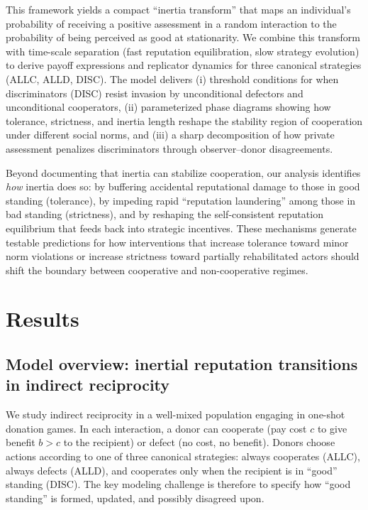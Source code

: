 \documentclass[fleqn,10pt]{wlscirep}
\begin{document}
This framework yields a compact ``inertia transform'' that maps an individual's probability of receiving a positive assessment in a random interaction to the probability of being perceived as good at stationarity. We combine this transform with time-scale separation (fast reputation equilibration, slow strategy evolution) to derive payoff expressions and replicator dynamics for three canonical strategies (ALLC, ALLD, DISC). The model delivers (i) threshold conditions for when discriminators (DISC) resist invasion by unconditional defectors and unconditional cooperators, (ii) parameterized phase diagrams showing how tolerance, strictness, and inertia length reshape the stability region of cooperation under different social norms, and (iii) a sharp decomposition of how private assessment penalizes discriminators through observer--donor disagreements.

Beyond documenting that inertia can stabilize cooperation, our analysis identifies \emph{how} inertia does so: by buffering accidental reputational damage to those in good standing (tolerance), by impeding rapid ``reputation laundering'' among those in bad standing (strictness), and by reshaping the self-consistent reputation equilibrium that feeds back into strategic incentives. These mechanisms generate testable predictions for how interventions that increase tolerance toward minor norm violations or increase strictness toward partially rehabilitated actors should shift the boundary between cooperative and non-cooperative regimes.



\section*{Results}\label{sec_model}


\subsection*{Model overview: inertial reputation transitions in indirect reciprocity}

We study indirect reciprocity in a well-mixed population engaging in one-shot donation games.
In each interaction, a donor can cooperate (pay cost $c$ to give benefit $b>c$ to the recipient) or defect (no cost, no benefit). Donors choose actions according to one of three canonical strategies: always cooperates (ALLC), always defects (ALLD), and cooperates only when the recipient is in ``good'' standing (DISC). The key modeling challenge is therefore to specify how ``good standing'' is formed, updated, and possibly disagreed upon.
\end{document}
